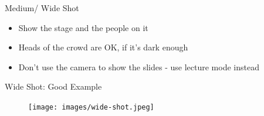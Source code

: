 \begin{frame}{Medium/ Wide Shot}
	\begin{itemize}
		\item Show the stage and the people on it
		\item Heads of the crowd are OK, if it's dark enough
		\item Don't use the camera to show the slides - use lecture mode instead
	\end{itemize}
\end{frame}

\begin{frame}{Wide Shot: Good Example}
	\begin{figure} 
		\centering
		\texttt{[image: images/wide-shot.jpeg]}
	\end{figure}
\end{frame}
